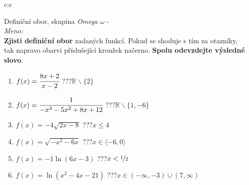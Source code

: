 \documentclass[10pt]{report}
\begin{document}
\newpage
\thispagestyle{empty}
\begin{tabular}{c:c}
\begin{minipage}[c][99mm][t]{0.49\linewidth}
\begin{center}
\vspace{7mm}
{\huge Definiční obor, skupina \textit{Omega $\omega$} -}\\[4.5mm]
\textit{Meno:}\phantom{xxxxxxxxxxxxxxxxxxxxxxxxxxxxxxxxxxxxxxxxxxxxxxxxxxxxxxxxxxxxxxxxx}\\[3.5mm]
\textbf{Zjisti definiční obor} zadaných funkcí. Pokud se shoduje s tím za otazníky,\\tak napravo obarvi příslušející kroužek načerno. \textbf{Spolu odevzdejte výsledné slovo}.\\[3mm]
\begin{minipage}{0.77\linewidth}
\begin{center}
\begin{varwidth}{\textwidth}
\begin{enumerate}
\normalsize
\item $f(x)=\cfrac{8x+2}{x-2}$\quad \dotfill\; ???\;\dotfill \quad $\mathbb{R}\smallsetminus\{2\}$
\item $f(x)=\cfrac{1}{-x^3-5x^2+8x+12}$\quad \dotfill\; ???\;\dotfill \quad $\mathbb{R}\smallsetminus\{1,-6\}$
\item $f(x)=-4\sqrt{2x-8}$\quad \dotfill\; ???\;\dotfill \quad $x\leq4$
\item $f(x)=\sqrt{-x^2-6x}$\quad \dotfill\; ???\;\dotfill \quad $x\in\langle-6 , 0\rangle$
\item $f(x)=-1\ln{(6x-3)}$\quad \dotfill\; ???\;\dotfill \quad $x<\nicefrac{1}{2}$
\item $f(x)=\ln{(x^2-4x-21)}$\quad \dotfill\; ???\;\dotfill \quad $x\in(-\infty , -3)\cup(7 , \infty)$
\end{enumerate}
\end{varwidth}
\end{center}
\end{minipage}
\begin{minipage}{0.20\linewidth}

\end{minipage}
\end{center}
\end{minipage}
\end{tabular}
\end{document}
